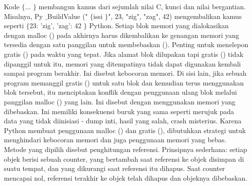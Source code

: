 

\vspace{12pt}
Kode  $  \{  $... $  \}  $ membangun kamus dari sejumlah nilai C, kunci dan nilai bergantian. Misalnya, Py $  \_  $BuildValue (" $  \{  $issi $  \}  $", 23, "zig", "zag", 42) mengembalikan kamus seperti  $  \{  $23: 'zig', 'zag': 42 $  \}  $ Python. 
Setiap blok memori yang dialokasikan dengan malloc () pada akhirnya harus dikembalikan ke genangan memori yang tersedia dengan satu panggilan untuk membebaskan (). Penting untuk menelepon gratis () pada waktu yang tepat. Jika alamat blok dilupakan tapi gratis () tidak dipanggil untuk itu, memori yang ditempatinya tidak dapat digunakan kembali sampai program berakhir. Ini disebut kebocoran memori. Di sisi lain, jika sebuah program memanggil gratis () untuk satu blok dan kemudian terus menggunakan blok tersebut, itu menciptakan konflik dengan penggunaan ulang blok melalui panggilan malloc () yang lain. Ini disebut dengan menggunakan memori yang dibebaskan. Ini memiliki konsekuensi buruk yang sama seperti merujuk pada data yang tidak diinisiasi - dump inti, hasil yang salah, crash misterius. 
Karena Python membuat penggunaan malloc () dan gratis (), dibutuhkan strategi untuk menghindari kebocoran memori dan juga penggunaan memori yang bebas. Metode yang dipilih disebut penghitungan referensi. Prinsipnya sederhana: setiap objek berisi sebuah counter, yang bertambah saat referensi ke objek disimpan di suatu tempat, dan yang dikurangi saat referensi itu dihapus. Saat counter mencapai nol, referensi terakhir ke objek telah dihapus dan objeknya dibebaskan. 
